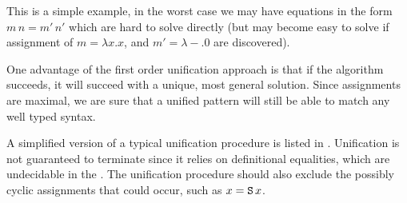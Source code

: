 This is a simple example, in the worst case we may have equations in the form $m\,n=m'\,n'$ which are hard to solve directly (but may become easy to solve if assignment of $m=\lambda x.x$, and $m'=\lambda-.0$ are discovered).

One advantage of the first order unification approach is that if the algorithm succeeds, it will succeed with a unique, most general solution.
Since assignments are maximal, we are sure that a unified pattern will still be able to match any well typed syntax.

A simplified version of a typical unification procedure is listed in .
Unification is not guaranteed to terminate since it relies on definitional equalities, which are undecidable in the \slang{}.
The unification procedure should also exclude the possibly cyclic assignments that could occur, such as $x=\mathtt{S}{}\,x$.

